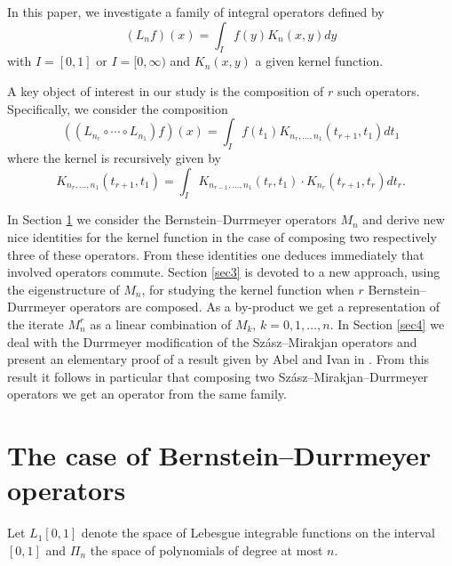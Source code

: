 \documentclass[12pt,reqno]{article}
\begin{document}
In this paper, we investigate a family of integral operators defined by 
\begin{equation*}
(L_n f)(x) = \int_I f(y) K_n(x,y) dy
\end{equation*}
with $I=[0,1]$ or $I=[0,\infty)$ and $K_n(x,y)$ a given kernel function.

A key object of interest in our study is the composition of $r$ such
operators. Specifically, we consider the composition 
\begin{equation*}
((L_{n_{r}}\circ \cdots \circ L_{n_{1}})f)(x)=\int_{I}f(t_{1})K_{n_{r},\dots
,n_{1}}(t_{r+1},t_{1})dt_{1}
\end{equation*}%
where the kernel is recursively given by 
\begin{equation*}
K_{n_{r},\dots ,n_{1}}(t_{r+1},t_{1})=\int_{I}K_{n_{r-1},\dots
,n_{1}}(t_{r},t_{1})\cdot K_{n_{r}}(t_{r+1},t_{r})dt_{r}.
\end{equation*}

In Section \ref{sec2} we consider the Bernstein--Durrmeyer operators $M_n$
and derive new nice identities for the kernel function in the case of
composing two respectively three of these operators. From these identities
one deduces immediately that involved operators commute. Section \ref{sec3}
is devoted to a new approach, using the eigenstructure of $M_n$, for
studying the kernel function when $r$ Bernstein--Durrmeyer operators are
composed.  As a by-product we get a representation of the iterate $M_n^r$ as
a linear combination of $M_k$, $k=0,1,\dots,n$. In Section \ref{sec4} we
deal with the Durrmeyer modification of the Sz\'{a}sz--Mirakjan operators
and present an elementary proof of a result given by Abel and Ivan in \cite%
{Abel-Ivan-Varna-CTF2005-proc-2006}. From this result it follows in
particular that composing two Sz\'{a}sz--Mirakjan--Durrmeyer operators we
get an operator from the same family.

\section{The case of Bernstein--Durrmeyer operators}

\label{sec2}

Let $L_{1}[0,1]$ denote the space of Lebesgue integrable functions on the
interval $[0,1]$ and $\Pi _{n}$ the space of polynomials of degree at most $%
n $.
\end{document}
